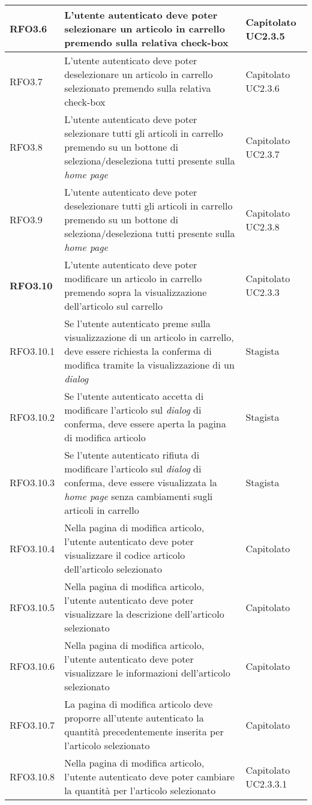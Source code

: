{\begin{center}
\begin{longtable}{ | >{\centering\arraybackslash}p{2.5cm} | >{\arraybackslash}p{7cm} | >{\centering\arraybackslash}p{2cm} | }
RFO3.6 & L'utente autenticato deve poter selezionare un articolo in carrello premendo sulla relativa check-box & Capitolato UC2.3.5\\ \hline
RFO3.7 & L'utente autenticato deve poter deselezionare un articolo in carrello selezionato premendo sulla relativa check-box & Capitolato UC2.3.6 \\ \hline
RFO3.8 & L'utente autenticato deve poter selezionare tutti gli articoli in carrello premendo su un bottone di seleziona/deseleziona tutti presente sulla \textit{home page} & Capitolato UC2.3.7\\ \hline
RFO3.9 & L'utente autenticato deve poter deselezionare tutti gli articoli in carrello premendo su un bottone di seleziona/deseleziona tutti presente sulla \textit{home page} & Capitolato UC2.3.8 \\ \hline
\textbf{RFO3.10} & L'utente autenticato deve poter modificare un articolo in carrello premendo sopra la visualizzazione dell'articolo sul carrello & Capitolato UC2.3.3\\ \hline
RFO3.10.1 & Se l'utente autenticato preme sulla visualizzazione di un articolo in carrello, deve essere richiesta la conferma di modifica tramite la visualizzazione di un \textit{dialog} & Stagista \\ \hline
RFO3.10.2 & Se l'utente autenticato accetta di modificare l'articolo sul \textit{dialog} di conferma, deve essere aperta la pagina di modifica articolo & Stagista \\ \hline
RFO3.10.3 & Se l'utente autenticato rifiuta di modificare l'articolo sul \textit{dialog} di conferma, deve essere visualizzata la \textit{home page} senza cambiamenti sugli articoli in carrello & Stagista \\ \hline
RFO3.10.4 & Nella pagina di modifica articolo, l'utente autenticato deve poter visualizzare il codice articolo dell'articolo selezionato & Capitolato \\ \hline
RFO3.10.5 & Nella pagina di modifica articolo, l'utente autenticato deve poter visualizzare la descrizione dell'articolo selezionato & Capitolato \\ \hline
RFO3.10.6 & Nella pagina di modifica articolo, l'utente autenticato deve poter visualizzare le informazioni dell'articolo selezionato & Capitolato \\ \hline
RFO3.10.7 & La pagina di modifica articolo deve proporre all'utente autenticato la quantità precedentemente inserita per l'articolo selezionato & Capitolato \\ \hline
RFO3.10.8 & Nella pagina di modifica articolo, l'utente autenticato deve poter cambiare la quantità per l'articolo selezionato & Capitolato UC2.3.3.1 \\ \hline

\end{longtable}
\end{center}}

